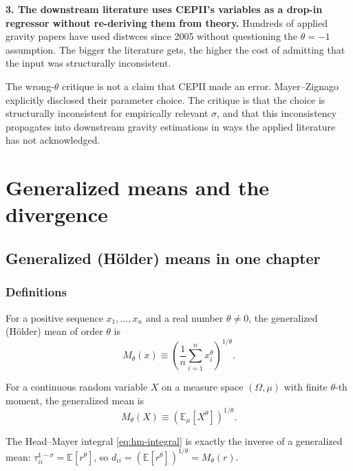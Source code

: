 \documentclass[11pt,letterpaper,oneside]{book}
\theoremstyle{definition}
\theoremstyle{remark}
\newcommand{\E}{\mathbb{E}}
\begin{document}
\textbf{3. The downstream literature uses CEPII's variables as a drop-in regressor without re-deriving them from theory.} Hundreds of applied gravity papers have used distwces since 2005 without questioning the $\theta = -1$ assumption. The bigger the literature gets, the higher the cost of admitting that the input was structurally inconsistent.

\begin{tcolorbox}[warning]
The wrong-$\theta$ critique is not a claim that CEPII made an error. Mayer--Zignago explicitly disclosed their parameter choice. The critique is that the choice is structurally inconsistent for empirically relevant $\sigma$, and that this inconsistency propagates into downstream gravity estimations in ways the applied literature has not acknowledged.
\end{tcolorbox}

\part{Generalized means and the divergence}

\chapter{Generalized (H\"older) means in one chapter}

\section{Definitions}

For a positive sequence $x_1, \ldots, x_n$ and a real number $\theta \neq 0$, the generalized (H\"older) mean of order $\theta$ is
\begin{equation}
M_\theta(x) \equiv \left( \frac{1}{n} \sum_{i=1}^n x_i^\theta \right)^{1/\theta}.
\label{eq:holder-mean-discrete}
\end{equation}

For a continuous random variable $X$ on a measure space $(\Omega, \mu)$ with finite $\theta$-th moment, the generalized mean is
\begin{equation}
M_\theta(X) \equiv \left( \E_\mu[X^\theta] \right)^{1/\theta}.
\label{eq:holder-mean-continuous}
\end{equation}

The Head--Mayer integral \eqref{eq:hm-integral} is exactly the inverse of a generalized mean: $\tau_{ii}^{1-\sigma} = \E[r^\theta]$, so $d_{ii} = (\E[r^\theta])^{1/\theta} = M_\theta(r)$.
\end{document}
